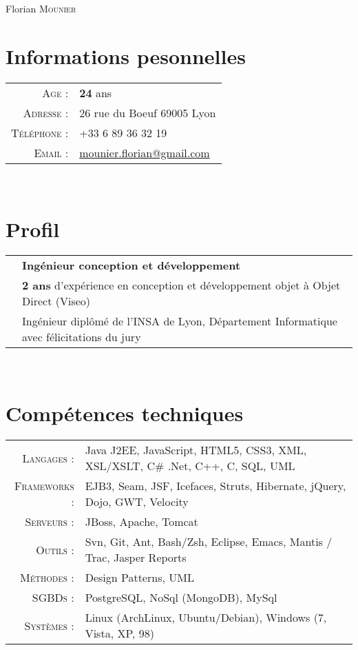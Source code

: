 \documentclass[a4paper,10pt]{article}
\begin{document}
\pagestyle{empty}
\par{\centering
  {\Huge Florian \textsc{Mounier}
  }\bigskip\par}

\section{Informations pesonnelles}
\begin{tabular}{rl}
  \textsc{Age :}        & \textbf{24} ans                                                    \\
  \textsc{Adresse :}    & 26 rue du Boeuf 69005 Lyon                                         \\
  \textsc{Téléphone :}  & +33 6 89 36 32 19                                                  \\
  \textsc{Email :}      & \href{mailto:mounier.florian@gmail.com}{mounier.florian@gmail.com} \\
\end{tabular}
\\
\section{Profil}
\begin{tabular}{rl}
  & \textbf {Ingénieur conception et développement}                                          \\
  & \textbf{2 ans} d'expérience en conception et développement objet à Objet Direct (Viseo)  \\
  & Ingénieur diplômé de l'INSA de Lyon, Département Informatique avec félicitations du jury \\
\end{tabular}
\\
\section{Compétences techniques}
\begin{tabular}{rl}
  \textsc{Langages :}        & Java J2EE, JavaScript, HTML5, CSS3, XML, XSL/XSLT, C\# .Net, C++, C, SQL, UML \\
  \textsc{Frameworks :}      & EJB3, Seam, JSF, Icefaces, Struts, Hibernate, jQuery, Dojo, GWT, Velocity     \\
  \textsc{Serveurs :}        & JBoss, Apache, Tomcat                                                         \\
  \textsc{Outils :}          & Svn, Git, Ant, Bash/Zsh, Eclipse, Emacs, Mantis / Trac, Jasper Reports        \\
  \textsc{Méthodes :}        & Design Patterns, UML                                                          \\
  \textsc{SGBDs :}           & PostgreSQL, NoSql (MongoDB), MySql                                            \\
  \textsc{Systèmes :}        & Linux (ArchLinux, Ubuntu/Debian), Windows (7, Vista, XP, 98)                  \\
\end{tabular}
\\
\end{document}
